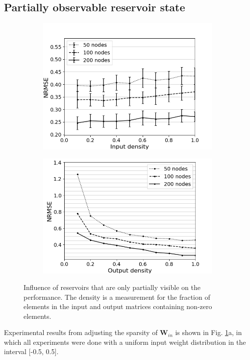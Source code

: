 \subsection{Partially observable reservoir state}

\begin{figure}[htbp]
  \centering
  \begin{subfigure}{.49\textwidth}
    \centering
    \includegraphics[width=0.8\linewidth]{img/input_density_all.png}
    \caption{}
  \end{subfigure}
  \begin{subfigure}{.49\textwidth}
    \centering
    \includegraphics[width=0.8\linewidth]{img/output_density_all.png}
    \caption{}
  \end{subfigure}
  \caption{
    Influence of reservoirs that are only partially visible on the
performance. The density is a measurement for the fraction of elements in the
input and output matrices containing non-zero elements.
  }
  \label{partial_visibility}
\end{figure}

Experimental results from adjusting the sparsity of $\mathbf{W}_{in}$ is shown
in Fig. \ref{partial_visibility}a, in which all experiments were done with a
uniform input weight distribution in the interval [-0.5, 0.5].

